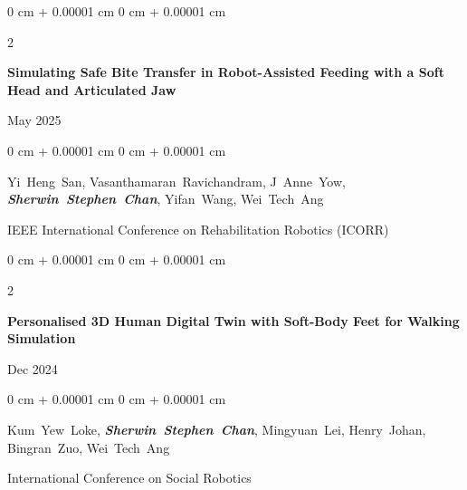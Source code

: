 \documentclass[10pt, letterpaper]{article}
\newenvironment{onecolentry}{
    \begin{adjustwidth}{
        0 cm + 0.00001 cm
    }{
        0 cm + 0.00001 cm
    }
}{
    \end{adjustwidth}
} %
\newenvironment{twocolentry}[2][]{
    \onecolentry
    \def\secondColumn{#2}
    \setcolumnwidth{\fill, 4.5 cm}
    \begin{paracol}{2}
}{
    \switchcolumn \raggedleft \secondColumn
    \end{paracol}
    \endonecolentry
} %
\begin{document}
        \vspace{0.2 cm}

        \begin{samepage}
            \begin{twocolentry}{
                May 2025
            }
                \textbf{Simulating Safe Bite Transfer in Robot-Assisted Feeding with a Soft Head and Articulated Jaw}
            \end{twocolentry}

            \vspace{0.10 cm}
            
            \begin{onecolentry}
                \mbox{Yi Heng San}, \mbox{Vasanthamaran Ravichandram}, \mbox{J Anne Yow}, \mbox{\textbf{\textit{Sherwin Stephen Chan}}}, \mbox{Yifan Wang}, \mbox{Wei Tech Ang}

                \vspace{0.10 cm}
                
        IEEE International Conference on Rehabilitation Robotics (ICORR)\end{onecolentry}
        \end{samepage}

        \vspace{0.2 cm}

        \begin{samepage}
            \begin{twocolentry}{
                Dec 2024
            }
                \textbf{Personalised 3D Human Digital Twin with Soft-Body Feet for Walking Simulation}
            \end{twocolentry}

            \vspace{0.10 cm}
            
            \begin{onecolentry}
                \mbox{Kum Yew Loke}, \mbox{\textbf{\textit{Sherwin Stephen Chan}}}, \mbox{Mingyuan Lei}, \mbox{Henry Johan}, \mbox{Bingran Zuo}, \mbox{Wei Tech Ang}

                \vspace{0.10 cm}
                
        International Conference on Social Robotics\end{onecolentry}
        \end{samepage}

        \vspace{0.2 cm}
\end{document}
